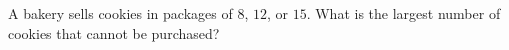 A bakery sells cookies in packages of $8$, $12$, or $15$. What is the largest number of cookies that cannot be purchased?
